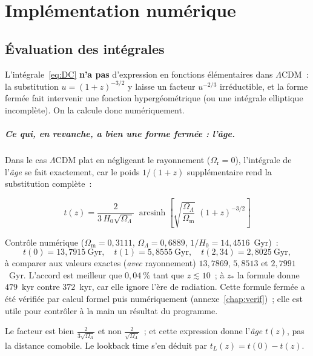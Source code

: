 \documentclass[11pt,a4paper,openany]{report}
\newcommand{\Gyr}{\text{Gyr}}
\newcommand{\Hzero}{H_{0}}
\newcommand{\Om}{\Omega_{\mathrm{m}}}
\newcommand{\Or}{\Omega_{\mathrm{r}}}
\newcommand{\OL}{\Omega_{\Lambda}}
\DeclareMathOperator{\arcsinh}{arcsinh}
\begin{document}
\chapter{Implémentation numérique}

\section{Évaluation des intégrales}

L'intégrale~\eqref{eq:DC} \textbf{n'a pas} d'expression en fonctions
élémentaires dans $\Lambda$CDM~: la substitution $u = (1+z)^{-3/2}$ y laisse un
facteur $u^{-2/3}$ irréductible, et la forme fermée fait intervenir une
fonction hypergéométrique (ou une intégrale elliptique incomplète). On la
calcule donc numériquement.

\paragraph{Ce qui, en revanche, a bien une forme fermée : l'âge.} Dans le cas
$\Lambda$CDM plat en négligeant le rayonnement ($\Or = 0$), l'intégrale de
l'\emph{âge} se fait exactement, car le poids $1/(1+z)$ supplémentaire rend la
substitution complète~:

\begin{equation}
\boxed{\;t(z) = \frac{2}{3\,\Hzero\sqrt{\OL}}\;
\arcsinh\!\left[\sqrt{\frac{\OL}{\Om}}\;(1+z)^{-3/2}\right]\;}
\label{eq:age_ferme}
\end{equation}

\noindent Contrôle numérique ($\Om = 0{,}3111$, $\OL = 0{,}6889$,
$1/\Hzero = 14{,}4516$~Gyr)~:
\[
t(0) = 13{,}7915~\Gyr, \quad t(1) = 5{,}8555~\Gyr, \quad
t(2{,}34) = 2{,}8025~\Gyr,
\]
à comparer aux valeurs exactes (\emph{avec} rayonnement) $13{,}7869$,
$5{,}8513$ et $2{,}7991$~Gyr. L'accord est meilleur que $0{,}04~\%$ tant que
$z \lesssim 10$~; à $z_{*}$ la formule donne $479$~kyr contre $372$~kyr, car
elle ignore l'ère de radiation. Cette formule fermée a été vérifiée par calcul
formel puis numériquement (annexe~\ref{chap:verif})~; elle est utile pour
contrôler à la main un résultat du programme.

\begin{tcolorbox}[attention]
Le facteur est bien $\tfrac{2}{3\sqrt{\OL}}$ et non $\tfrac{2}{\sqrt{\OL}}$~;
et cette expression donne l'\emph{âge} $t(z)$, pas la distance comobile.
Le lookback time s'en déduit par $t_{L}(z) = t(0) - t(z)$.
\end{tcolorbox}
\end{document}
